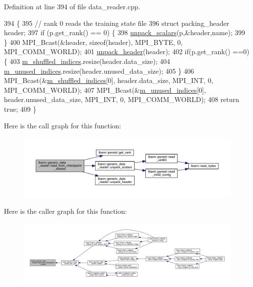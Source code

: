 Definition at line 394 of file data\+\_\+reader.\+cpp.


\begin{DoxyCode}
394                                                                                        \{
395   \textcolor{comment}{// rank 0 reads the training state file}
396   \textcolor{keyword}{struct }packing\_header header;
397   \textcolor{keywordflow}{if} (p.get\_rank() == 0) \{
398     \hyperlink{classlbann_1_1generic__data__reader_a8de5c2e24d4cc2211145ed5dc37cf228}{unpack\_scalars}(p,&header,name);
399   \}
400   MPI\_Bcast(&header, \textcolor{keyword}{sizeof}(header), MPI\_BYTE, 0, MPI\_COMM\_WORLD);
401   \hyperlink{classlbann_1_1generic__data__reader_a3e1c13778c04ca9fa5136ee7ee3893fb}{unpack\_header}(header);
402   \textcolor{keywordflow}{if}(p.get\_rank() ==0)\{
403     \hyperlink{classlbann_1_1generic__data__reader_aaab6aeff67ffff1c689336851fec2c57}{m\_shuffled\_indices}.resize(header.data\_size);
404     \hyperlink{classlbann_1_1generic__data__reader_a0bc0ee42e95d23687ddcc30d6c338b19}{m\_unused\_indices}.resize(header.unused\_data\_size);
405   \}
406   MPI\_Bcast(&\hyperlink{classlbann_1_1generic__data__reader_aaab6aeff67ffff1c689336851fec2c57}{m\_shuffled\_indices}[0], header.data\_size, MPI\_INT, 0, MPI\_COMM\_WORLD);
407   MPI\_Bcast(&\hyperlink{classlbann_1_1generic__data__reader_a0bc0ee42e95d23687ddcc30d6c338b19}{m\_unused\_indices}[0], header.unused\_data\_size, MPI\_INT, 0, MPI\_COMM\_WORLD);
408   \textcolor{keywordflow}{return} \textcolor{keyword}{true};
409 \}
\end{DoxyCode}
Here is the call graph for this function\+:\nopagebreak
\begin{figure}[H]
\begin{center}
\leavevmode
\includegraphics[width=350pt]{classlbann_1_1generic__data__reader_a85119fae17feb8fda32f8a2f40869436_cgraph}
\end{center}
\end{figure}
Here is the caller graph for this function\+:\nopagebreak
\begin{figure}[H]
\begin{center}
\leavevmode
\includegraphics[width=350pt]{classlbann_1_1generic__data__reader_a85119fae17feb8fda32f8a2f40869436_icgraph}
\end{center}
\end{figure}
